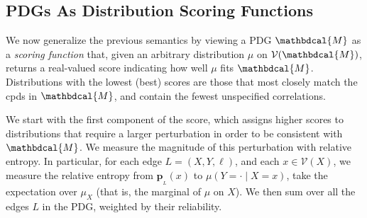\documentclass{article}
\theoremstyle{plain}
\theoremstyle{definition}
\theoremstyle{remark}
\newcommand\mat[1]{\mathbf{#1}}
\newcommand{\bp}[1][L]{\mat{p}_{\!_{#1}\!}}
\newcommand{\V}{\mathcal V}
\newcommand{\dg}[1]{\mathbdcal{#1}}
\numberwithin{equation}{section}
\begin{document}
\subsection{PDGs As Distribution Scoring Functions}
\label{sec:scoring-semantics}   
We now generalize the previous semantics by viewing a PDG $\dg M$ as
a \emph{scoring function} that, given an arbitrary distribution $\mu$ on $\V(\dg M)$, 
returns a real-valued score indicating how 
well
$\mu$ fits $\dg M$. Distributions with the lowest (best) scores are those that
most closely match the cpds in $\dg M$, and contain the fewest unspecified correlations.

We start with the first component of the score, which assigns higher scores to distributions that require a larger perturbation in order to be consistent with $\dg M$.  
We measure the magnitude of this perturbation with relative entropy. In particular, for each edge $L = (X,Y, \ell)$, and each $x \in \V(X)$, we measure the relative entropy from $\bp(x)$ to $\mu(Y \!= \cdot\mid X=x)$, take the expectation over $\mu_X$ (that is, the marginal of $\mu$ on $X$). We then sum over all the edges $L$ in the PDG, weighted by their reliability.
\end{document}
